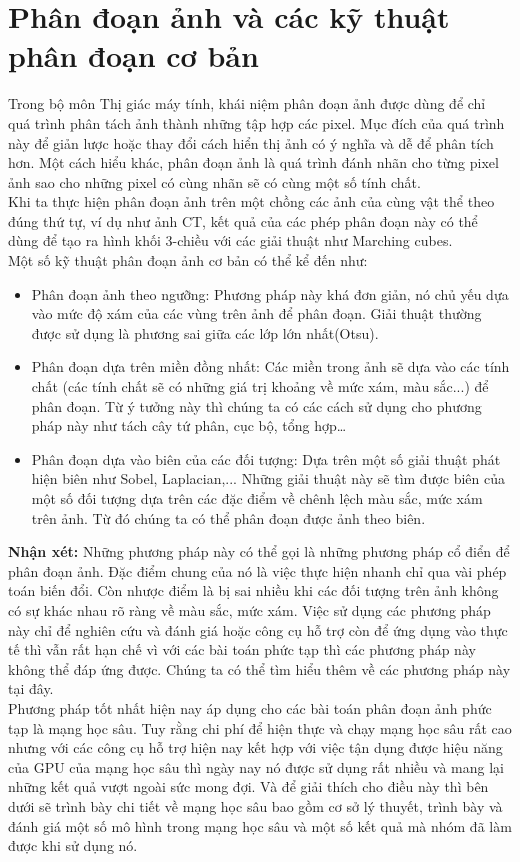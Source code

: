 \section{Phân đoạn ảnh và các kỹ thuật phân đoạn cơ bản}
Trong bộ môn Thị giác máy tính, khái niệm phân đoạn ảnh được dùng để chỉ quá trình phân tách ảnh thành những tập hợp các pixel. Mục đích của quá trình này để giản lược hoặc thay đổi cách hiển thị ảnh có ý nghĩa và dễ để phân tích hơn. Một cách hiểu khác, phân đoạn ảnh là quá trình đánh nhãn cho từng pixel ảnh sao cho những pixel có cùng nhãn sẽ có cùng một số tính chất.\\
Khi ta thực hiện phân đoạn ảnh trên một chồng các ảnh của cùng vật thể theo đúng thứ tự, ví dụ như ảnh CT, kết quả của các phép phân đoạn này có thể dùng để tạo ra hình khối 3-chiều với các giải thuật như Marching cubes.\\
Một số kỹ thuật phân đoạn ảnh cơ bản có thể kể đến như:
\begin{itemize}
\item Phân đoạn ảnh theo ngưỡng: Phương pháp này khá đơn giản, nó chủ yếu dựa vào mức độ xám của các vùng trên ảnh để phân đoạn. Giải thuật thường được sử dụng là phương sai giữa các lớp lớn nhất(Otsu).
\item Phân đoạn dựa trên miền đồng nhất: Các miền trong ảnh sẽ dựa vào các tính chất (các tính chất sẽ có những giá trị khoảng về mức xám, màu sắc...) để phân đoạn. Từ ý tưởng này thì chúng ta có các cách sử dụng cho phương pháp này như tách cây tứ phân, cục bộ, tổng hợp…
\item Phân đoạn dựa vào biên của các đối tượng: Dựa trên một số giải thuật phát hiện biên như Sobel, Laplacian,... Những giải thuật này sẽ tìm được biên của một số đối tượng dựa trên các đặc điểm về chênh lệch màu sắc, mức xám trên ảnh. Từ đó chúng ta có thể phân đoạn được ảnh theo biên.
\end{itemize}
\textbf{Nhận xét:} Những phương pháp này có thể gọi là những phương pháp cổ điển để phân đoạn ảnh. Đặc điểm chung của nó là việc thực hiện nhanh chỉ qua vài phép toán biến đổi. Còn nhược điểm là bị sai nhiều khi các đối tượng trên ảnh không có sự khác nhau rõ ràng về màu sắc, mức xám. Việc sử dụng các phương pháp này chỉ để nghiên cứu và đánh giá hoặc công cụ hỗ trợ còn để ứng dụng vào thực tế thì vẫn rất hạn chế vì với các bài toán phức tạp thì các phương pháp này không thể đáp ứng được. Chúng ta có thể tìm hiểu thêm về các phương pháp này tại đây.\cite{segoverview}\\
Phương pháp tốt nhất hiện nay áp dụng cho các bài toán phân đoạn ảnh phức tạp là mạng học sâu. Tuy rằng chi phí để hiện thực và chạy mạng học sâu rất cao nhưng với các công cụ hỗ trợ hiện nay kết hợp với việc tận dụng được hiệu năng của GPU của mạng học sâu thì ngày nay nó được sử dụng rất nhiều và mang lại những kết quả vượt ngoài sức mong đợi. Và để giải thích cho điều này thì bên dưới sẽ trình bày chi tiết về mạng học sâu bao gồm cơ sở lý thuyết, trình bày và đánh giá một số mô hình trong mạng học sâu và một số kết quả mà nhóm đã làm được khi sử dụng nó.


